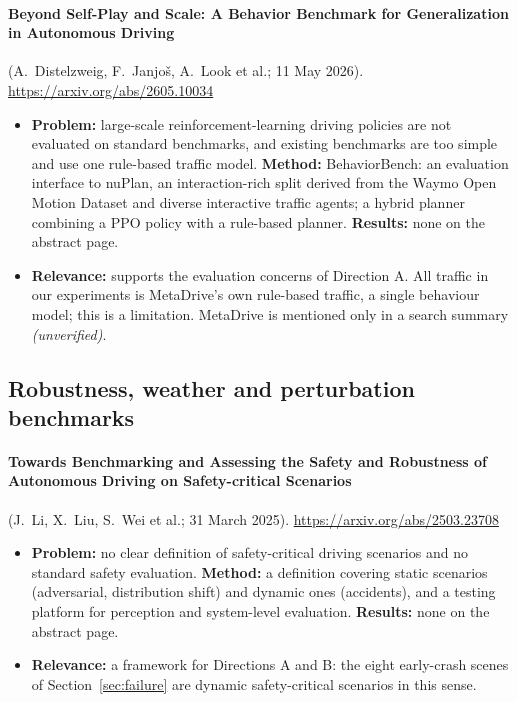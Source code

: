 \paragraph{Beyond Self-Play and Scale: A Behavior Benchmark for Generalization in Autonomous Driving} (A.~Distelzweig, F.~Janjo\v{s}, A.~Look et al.; 11 May 2026). \url{https://arxiv.org/abs/2605.10034}
\begin{itemize}
\item \textbf{Problem:} large-scale reinforcement-learning driving policies are not evaluated on standard benchmarks, and existing benchmarks are too simple and use one rule-based traffic model. \textbf{Method:} BehaviorBench: an evaluation interface to nuPlan, an interaction-rich split derived from the Waymo Open Motion Dataset and diverse interactive traffic agents; a hybrid planner combining a PPO policy with a rule-based planner. \textbf{Results:} none on the abstract page.
\item \textbf{Relevance:} supports the evaluation concerns of Direction A. All traffic in our experiments is MetaDrive's own rule-based traffic, a single behaviour model; this is a limitation. MetaDrive is mentioned only in a search summary \emph{(unverified)}.
\end{itemize}

\subsection{Robustness, weather and perturbation benchmarks}

\paragraph{Towards Benchmarking and Assessing the Safety and Robustness of Autonomous Driving on Safety-critical Scenarios} (J.~Li, X.~Liu, S.~Wei et al.; 31 March 2025). \url{https://arxiv.org/abs/2503.23708}
\begin{itemize}
\item \textbf{Problem:} no clear definition of safety-critical driving scenarios and no standard safety evaluation. \textbf{Method:} a definition covering static scenarios (adversarial, distribution shift) and dynamic ones (accidents), and a testing platform for perception and system-level evaluation. \textbf{Results:} none on the abstract page.
\item \textbf{Relevance:} a framework for Directions A and B: the eight early-crash scenes of Section~\ref{sec:failure} are dynamic safety-critical scenarios in this sense.
\end{itemize}

